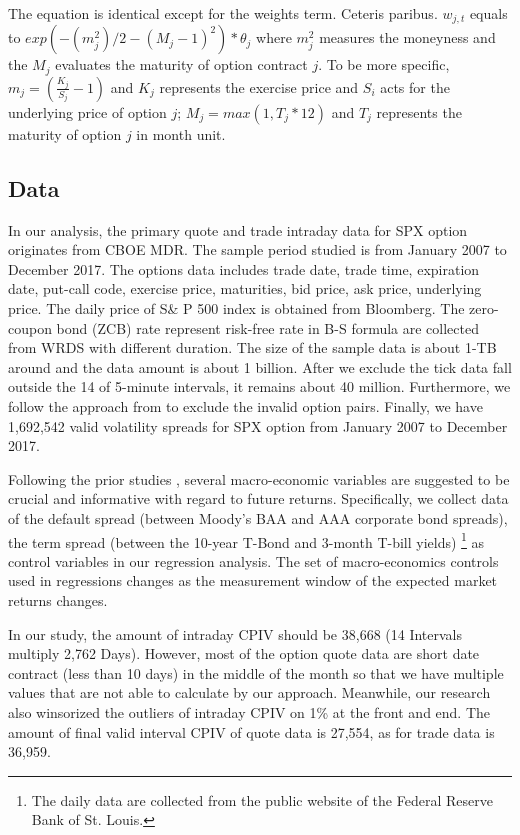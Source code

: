 \begin{enumerate}
The equation is identical except for the weights term. Ceteris paribus. $w_{j,t}$ equals to $exp(-(m_{j}^{2})/2 -(M_{j} - 1)^{2}) * \theta_{j}$ where $m_{j}^{2}$ measures the moneyness and the $M_{j}$ evaluates the maturity of option contract $j$. To be more specific, $m_{j} =  (\frac{K_{j}}{S_{j}} - 1)$ and $K_{j}$ represents the exercise price and $S_{i}$ acts for the underlying price of option $j$; $M_{j} =  max(1, T_{j}*12) $ and $T_{j}$ represents the maturity of option $j$ in month unit. 


\end{enumerate}


\subsection{Data}
In our analysis, the primary quote and trade intraday data for SPX option originates from CBOE MDR. The sample period studied is from January 2007 to December 2017. The options data includes trade date, trade time, expiration date, put-call code, exercise price, maturities, bid price, ask price, underlying price. The daily price of S\& P 500 index is obtained from Bloomberg. The zero-coupon bond (ZCB) rate represent risk-free rate in B-S formula are collected from WRDS with different duration. The size of the sample data is about 1-TB around and the data amount is about 1 billion. After we exclude the tick data fall outside the 14 of 5-minute intervals, it remains about 40 million. Furthermore, we follow the approach from \textcite{ofek2004limited} to exclude the invalid option pairs. Finally, we have 1,692,542 valid volatility spreads for SPX option from January 2007 to December 2017. 

Following the prior studies \textcite{bollerslev2009expected}, several macro-economic variables are suggested to be crucial and informative with regard to future returns. Specifically, we collect data of the default spread (between Moody's BAA and AAA corporate bond spreads), the term spread (between the 10-year T-Bond and 3-month T-bill yields) \footnote{The daily data are collected from the public website of the Federal Reserve Bank of St. Louis.} as control variables in our regression analysis. The set of macro-economics controls used in regressions changes as the measurement window of the expected market returns changes. 

In our study, the amount of intraday CPIV should be 38,668 (14 Intervals multiply 2,762 Days). However, most of the option quote data are short date contract (less than 10 days) in the middle of the month so that we have multiple values that are not able to calculate by our approach. Meanwhile, our research also winsorized the outliers of intraday CPIV on 1\% at the front and end. The amount of final valid interval CPIV of quote data is 27,554, as for trade data is 36,959.


